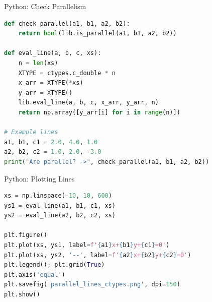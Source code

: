 \documentclass{beamer}
\begin{document}
\begin{frame}[fragile]{Python: Check Parallelism}
\begin{lstlisting}[language=Python, basicstyle=\ttfamily\scriptsize, keywordstyle=\color{blue}]
def check_parallel(a1, b1, a2, b2):
    return bool(lib.is_parallel(a1, b1, a2, b2))

def eval_line(a, b, c, xs):
    n = len(xs)
    XTYPE = ctypes.c_double * n
    x_arr = XTYPE(*xs)
    y_arr = XTYPE()
    lib.eval_line(a, b, c, x_arr, y_arr, n)
    return np.array([y_arr[i] for i in range(n)])

# Example lines
a1, b1, c1 = 2.0, 4.0, 1.0
a2, b2, c2 = 1.0, 2.0, -3.0
print("Are parallel? ->", check_parallel(a1, b1, a2, b2))
\end{lstlisting}
\end{frame}

\begin{frame}[fragile]{Python: Plotting Lines}
\begin{lstlisting}[language=Python, basicstyle=\ttfamily\scriptsize, keywordstyle=\color{blue}]
xs = np.linspace(-10, 10, 600)
ys1 = eval_line(a1, b1, c1, xs)
ys2 = eval_line(a2, b2, c2, xs)

plt.figure()
plt.plot(xs, ys1, label=f'{a1}x+{b1}y+{c1}=0')
plt.plot(xs, ys2, '--', label=f'{a2}x+{b2}y+{c2}=0')
plt.legend(); plt.grid(True)
plt.axis('equal')
plt.savefig('parallel_lines_ctypes.png', dpi=150)
plt.show()
\end{lstlisting}
\end{frame}
\end{document}
